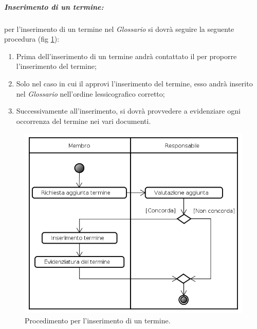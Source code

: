 \subparagraph{Inserimento di un termine:}
per l'inserimento di un termine nel \emph{Glossario} si dovrà seguire la seguente procedura (fig \ref{diagramma_add}):
\begin{enumerate}
\item Prima dell'inserimento di un termine andrà contattato il \projectManager{} per proporre l'inserimento del termine;
\item Solo nel caso in cui il \projectManager{} approvi l'inserimento del termine, esso andrà inserito nel \emph{Glossario} nell'ordine lessicografico corretto;
\item Successivamente all'inserimento, si dovrà provvedere a evidenziare ogni occorrenza del termine nei vari documenti.
\end{enumerate}
\begin{figure}[!h]
\centering
\includegraphics[scale=0.5] {./content/Immagini/Aggiunta_Termine.png}
\caption{Procedimento per l'inserimento di un termine.}
\label{diagramma_add}
\end{figure}

